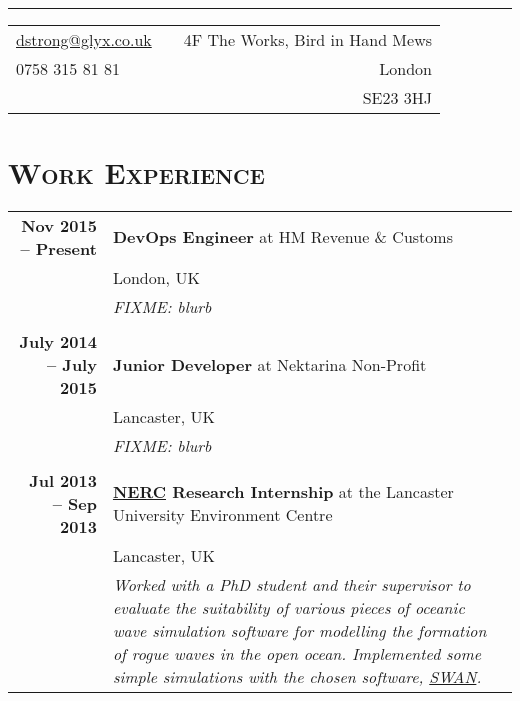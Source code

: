\documentclass[a4paper,10pt]{article} %
\begin{document}
\pagestyle{empty} %


\\ %
\hrule
\footnotesize{
\begin{tabularx}{\textwidth}{lXr}
\href{mailto:dstrong@glyx.co.uk}{dstrong@glyx.co.uk} & & {4F The Works, Bird in Hand Mews}\\
{0758 315 81 81}                                     & & {London}\\ 
                                                     & & {SE23 3HJ}
\end{tabularx}
}


\section{\textsc{Work Experience}}
\centering
\begin{tabularx}{\textwidth}{r|X}
\textbf{Nov 2015 -- Present}       & \textbf{DevOps Engineer} at HM Revenue \& Customs \\
                                   & London, UK \\
                                   & \footnotesize\emph{FIXME: blurb} \\
\multicolumn{2}{r}{} \\ %
\textbf{July 2014 -- July 2015}    & \textbf{Junior Developer} at {Nektarina Non-Profit}\\
                                   & Lancaster, UK\\
                                   & \footnotesize\emph{FIXME: blurb}\\
\multicolumn{2}{r}{} \\ %
\textbf{Jul 2013 --  Sep 2013}     & \textbf{\href{http://www.nerc.ac.uk/}{NERC} Research Internship} at the Lancaster University Environment Centre \\
                                   & Lancaster, UK \\
                                   & \footnotesize\emph{Worked with a PhD student and their supervisor to evaluate the suitability of various pieces of oceanic wave simulation software for modelling the formation of rogue waves in the open ocean. Implemented some simple simulations with the chosen software, \href{http://swanmodel.sourceforge.net/}{SWAN}.}                           
\end{tabularx}
\end{document}
